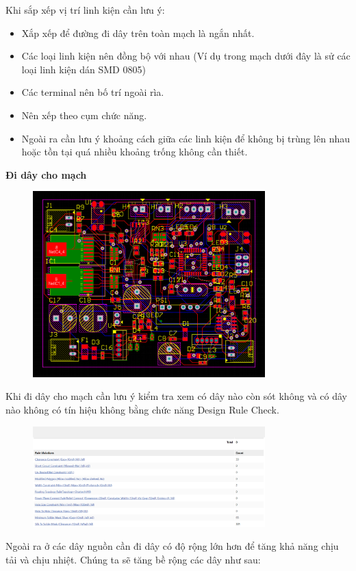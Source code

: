 \cleardoublepage
Khi sắp xếp vị trí linh kiện cần lưu ý:
\begin{itemize}
    \item Xắp xếp để đường đi dây trên toàn mạch là ngắn nhất.
    \item Các loại linh kiện nên đồng bộ với nhau (Ví dụ trong mạch dưới đây là sử các loại linh kiện dán SMD 0805)
    \item Các terminal nên bố trí ngoài rìa. 
    \item Nên xếp theo cụm chức năng.
    \item Ngoài ra cần lưu ý khoảng cách giữa các linh kiện để không bị trùng lên nhau hoặc tồn tại quá nhiều khoảng trống không cần thiết.
\end{itemize}   
\textbf{Đi dây cho mạch}
\begin{figure}[H]
    \centering
    \includegraphics[width=0.8\textwidth]{pictures/7f.png}
\end{figure}
Khi đi dây cho mạch cần lưu ý kiểm tra xem có dây nào còn sót không và có dây nào không có tín hiệu không bằng chức năng Design Rule Check.
\begin{figure}[H]
    \centering
    \includegraphics[width=0.8\textwidth]{pictures/7g.png}
\end{figure}
Ngoài ra ở các dây nguồn cần đi dây có độ rộng lớn hơn để tăng khả năng chịu tải và chịu nhiệt. Chúng ta sẽ tăng bề rộng các dây như sau:
